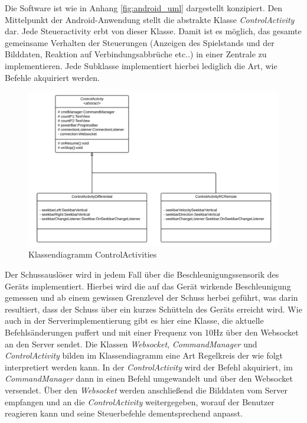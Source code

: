 Die Software ist wie in Anhang \ref{fig:android_uml} dargestellt konzipiert. Den Mittelpunkt der Android-Anwendung stellt die abstrakte Klasse \textit{ControlActivity} dar. Jede Steueractivity erbt von dieser Klasse. Damit ist es möglich, das gesamte gemeinsame Verhalten der Steuerungen (Anzeigen des Spielstands und der Bilddaten, Reaktion auf Verbindungsabbrüche etc..) in einer Zentrale zu implementieren. Jede Subklasse implementiert hierbei lediglich die Art, wie Befehle akquiriert werden. 

\begin{figure}[!h]
	\includegraphics[width=\textwidth]{images/uml_controlactivity_android.pdf}
	\caption{Klassendiagramm ControlActivities}
	\label{fig:uml_controlactivity_android}
\end{figure}

Der Schussauslöser wird in jedem Fall über die Beschleunigungssensorik des Geräts implementiert. Hierbei wird die auf das Gerät wirkende Beschleunigung gemessen und ab einem gewissen Grenzlevel der Schuss herbei geführt, was darin resultiert, dass der Schuss über ein kurzes Schütteln des Geräts erreicht wird.
Wie auch in der Serverimplementierung gibt es hier eine Klasse, die aktuelle Befehlsänderungen puffert und mit einer Frequenz von 10Hz über den Websocket an den Server sendet.
Die Klassen \textit{Websocket}, \textit{CommandManager} und \textit{ControlActivity} bilden im Klassendiagramm eine Art Regelkreis der wie folgt interpretiert werden kann. In der \textit{ControlActivity} wird der Befehl akquiriert, im \textit{CommandManager} dann in einen Befehl umgewandelt und über den Websocket versendet. Über den \textit{Websocket} werden anschließend die Bilddaten vom Server empfangen und an die \textit{ControlActivity} weitergegeben, worauf der Benutzer reagieren kann und seine Steuerbefehle dementsprechend anpasst.
 

